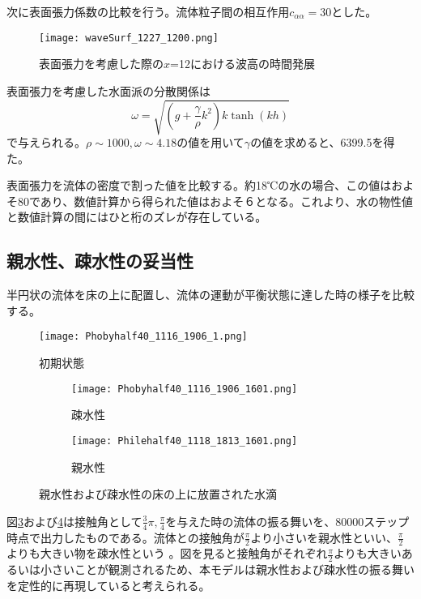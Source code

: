 \documentclass[]{jsarticle}
\begin{document}
次に表面張力係数の比較を行う。流体粒子間の相互作用$c_{\alpha\alpha}=30$とした。
\begin{figure}[H]
  \centering
  \texttt{[image: waveSurf\_1227\_1200.png]}
  \caption{表面張力を考慮した際の$x$=12における波高の時間発展}
  \label{fig:waveSurfEvolwithSurfTension}
\end{figure}

表面張力を考慮した水面派の分散関係は
\begin{equation}
\omega=\sqrt{\left(g+\frac{\gamma}{\rho}k^2 \right)k \tanh (kh)}
\end{equation}
で与えられる\cite{tatsumiKiso}。$\rho\sim1000, \omega\sim4.18$の値を用いて$\gamma$の値を求めると、6399.5を得た。

表面張力を流体の密度で割った値を比較する。約18℃の水の場合、この値はおよそ80であり、数値計算から得られた値はおよそ６となる。これより、水の物性値と数値計算の間にはひと桁のズレが存在している。


\subsection{親水性、疎水性の妥当性}
\label{subsec:validity}

半円状の流体を床の上に配置し、流体の運動が平衡状態に達した時の様子を比較する。
\begin{figure}[H]
  \centering
  \texttt{[image: Phobyhalf40\_1116\_1906\_1.png]}
  \caption{初期状態}
  \label{fig:contactInitial}
\end{figure}

\begin{figure}[H]
  \centering
  \begin{subfigure}{0.8\columnwidth}
    \centering
    \texttt{[image: Phobyhalf40\_1116\_1906\_1601.png]}
    \caption{疎水性}
    \label{fig:PhobyDrop}
  \end{subfigure}
  \begin{subfigure}{0.8\columnwidth}
    \centering
    \texttt{[image: Philehalf40\_1118\_1813\_1601.png]}
    \caption{親水性}
    \label{fig:PhileDrop}
  \end{subfigure}
  \caption{親水性および疎水性の床の上に放置された水滴}
  \label{fig:contactAngles}
\end{figure}

図\ref{fig:PhobyDrop}および\ref{fig:PhileDrop}は接触角として$\frac{3}{4}\pi, \frac{\pi}{4}$を与えた時の流体の振る舞いを、80000ステップ時点で出力したものである。流体との接触角が$\frac{\pi}{2}$より小さいを親水性といい、$\frac{\pi}{2}$よりも大きい物を疎水性という \cite{Law2014}。図を見ると接触角がそれぞれ$\frac{\pi}{2}$よりも大きいあるいは小さいことが観測されるため、本モデルは親水性および疎水性の振る舞いを定性的に再現していると考えられる。
\end{document}
